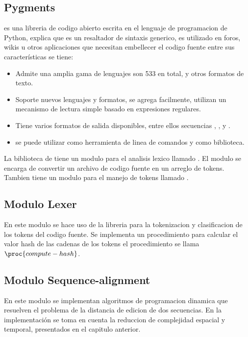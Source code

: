 \subsection{Pygments}
 es una libreria de codigo abierto escrita en el lenguaje de programacion de Python, \cite{brandl2022} explica que  es un resaltador de sintaxis generico, es utilizado en foros, wikis u otros aplicaciones que necesitan embellecer el codigo fuente entre sus características se tiene:
\begin{itemize}
  \item Admite una amplia gama de lenguajes son 533 en total, y otros formatos de texto.
  \item Soporte nuevos lenguajes y formatos, se agrega facilmente, utilizan un mecanismo de lectura simple basado en expresiones regulares.
  \item Tiene varios formatos de salida disponibles, entre ellos secuencias , ,  y .
  \item se puede utilizar como herramienta de linea de comandos y como biblioteca.
\end{itemize}
La biblioteca de  tiene un modulo para el analisis lexico llamado . El modulo se encarga de convertir un archivo de codigo fuente en un arreglo de tokens. Tambien tiene un modulo para el manejo de tokens llamado .
\subsection{Modulo Lexer}
En este modulo se hace uso de la libreria  para la tokenizacion y clasificacion de los tokens del codigo fuente. Se implementa un procedimiento para calcular el valor hash de las cadenas de los tokens el procedimiento se llama $\proc{compute-hash}$.


\subsection{Modulo Sequence-alignment}
En este modulo se implementan algoritmos de programacion dinamica que resuelven el problema de la distancia de edicion de dos secuencias. En la implementación  se toma en cuenta la reduccion de complejidad espacial y temporal, presentados en el capitulo anterior.



